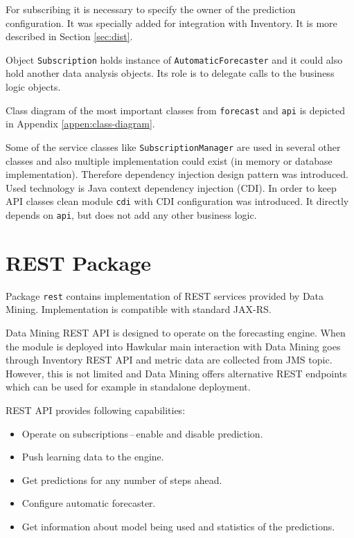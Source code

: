     For subscribing it is necessary to specify the owner of the prediction configuration. It was specially added for
    integration with Inventory. It is more described in Section \ref{sec:dist}.

    Object \texttt{Subscription} holds instance of \texttt{AutomaticForecaster} and it could also hold another
    data analysis objects. Its role is to delegate calls to the business logic objects.

    Class diagram of the most important classes from \texttt{forecast} and \texttt{api} is depicted in Appendix
    \ref{appen:class-diagram}.

    Some of the service classes like \texttt{SubscriptionManager} are used in several other classes and also multiple
    implementation could exist (in memory or database implementation). Therefore dependency injection
    design pattern was introduced. Used technology is Java context dependency injection (CDI). In order to keep
    API classes clean module \texttt{cdi} with CDI configuration was introduced. It directly depends on \texttt{api},
    but does not add any other business logic.

    \section{REST Package}
    Package \texttt{rest} contains implementation of REST services provided by Data Mining. Implementation is
    compatible with standard JAX-RS.

    Data Mining REST API is designed to operate on the forecasting engine. When the module is deployed into Hawkular
    main interaction with Data Mining goes through Inventory REST API and metric data are collected from JMS topic.
    However, this is not limited and Data Mining offers alternative REST endpoints which can be used for
    example in standalone deployment.

    REST API provides following capabilities:

    \begin{itemize}
        \item Operate on subscriptions\,--\,enable and disable prediction.
        \item Push learning data to the engine.
        \item Get predictions for any number of steps ahead.
        \item Configure automatic forecaster.
        \item Get information about model being used and statistics of the predictions.
    \end{itemize}

